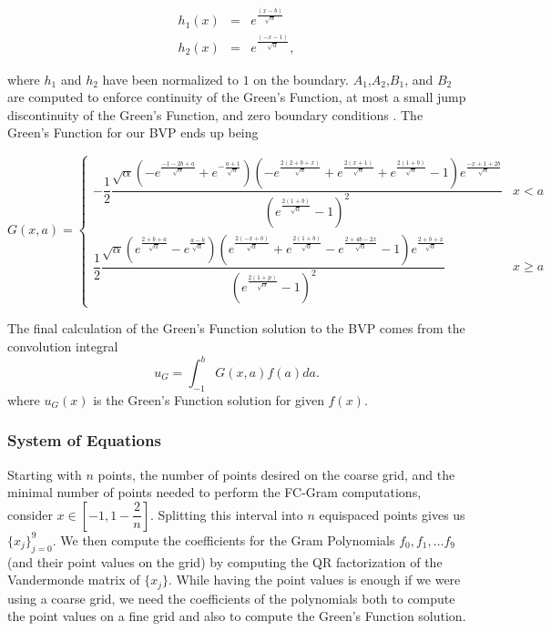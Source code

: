 \documentclass[11pt]{amsart}
\begin{document}
\begin{eqnarray}
h_1(x) &=& e^{\frac{(x-b)}{\sqrt{\alpha}}} \\
h_2(x) &=& e^{\frac{(-x-1)}{\sqrt{\alpha}}},
\end{eqnarray}

where $h_1$ and $h_2$ have been normalized to $1$ on the boundary.  $A_1$,$A_2$,$B_1$, and $B_2$ are computed to enforce continuity of the Green's Function, at most a small jump discontinuity of the Green's Function, and zero boundary conditions \cite{BO}.  The Green's Function for our BVP ends up being

\begin{equation}
G(x,a)=\begin{cases} 
-\dfrac{1}{2} \dfrac{\sqrt{\alpha}\left(-e^{\frac{-1-2b+a}{\sqrt{\alpha}}}+e^{-\frac{a+1}{\sqrt{\alpha}}}\right)\left(-e^{\frac{2(2+b+x)}{\sqrt{\alpha}}}+e^{\frac{2(x+1)}{\sqrt{\alpha}}}+e^{\frac{2(1+b)}{\sqrt{\alpha}}}-1\right)e^{\frac{-x+1+2b}{\sqrt{\alpha}}}}{\left(e^{\frac{2(1+b)}{\sqrt{\alpha}}}-1\right)^2} & x<a \\
\dfrac{1}{2} \dfrac{\sqrt{\alpha} \left(e^{\frac{2+b+a}{\sqrt{\alpha}}} -e^{\frac{a-b}{\sqrt{\alpha}}}\right)\left(e^{\frac{2(-x+b)}{\sqrt{\alpha}}}+e^{\frac{2(1+b)}{\sqrt{\alpha}}}-e^{\frac{2+4b-2x}{\sqrt{\alpha}}}-1\right)e^{\frac{2+b+x}{\sqrt{\alpha}}}}{\left(e^{\frac{2(1+p)}{\sqrt{\alpha}}}-1\right)^2} & x \geq a

\end{cases}
\end{equation}

The final calculation of the Green's Function solution to the BVP comes from the convolution integral
\begin{equation}
u_G=\int_{-1}^b G(x,a)f(a)da.
\end{equation}
where $u_G(x)$ is the Green's Function solution for given $f(x)$.

\subsubsection{System of Equations}

Starting with $n$ points, the number of points desired on the coarse grid, and the minimal number of points needed to perform the FC-Gram computations, consider $x \in [-1, 1-\dfrac{2}{n}]$.  Splitting this interval into $n$ equispaced points gives us $\{x_j\}_{j=0}^9$.  We then compute the coefficients for the Gram Polynomials $f_0,f_1,\ldots f_9$(and their point values on the grid) by computing the QR factorization of the Vandermonde matrix of $\{x_j\}$.  While having the point values is enough if we were using a coarse grid, we need the coefficients of the polynomials both to compute the point values on a fine grid and also to compute the Green's Function solution.  
\end{document}

